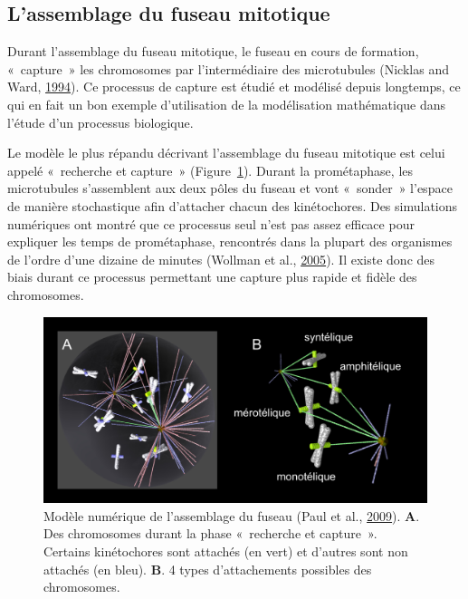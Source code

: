 \documentclass[12pt,a4paper,twoside,openright]{book}
\begin{document}
\subsection{L'assemblage du fuseau
mitotique}\label{lassemblage-du-fuseau-mitotique}

Durant l'assemblage du fuseau mitotique, le fuseau en cours de
formation, «~capture~» les chromosomes par l'intermédiaire des
microtubules (Nicklas and Ward,
\protect\hyperlink{ref-Nicklas1994}{1994}). Ce processus de capture est
étudié et modélisé depuis longtemps, ce qui en fait un bon exemple
d'utilisation de la modélisation mathématique dans l'étude d'un
processus biologique.

Le modèle le plus répandu décrivant l'assemblage du fuseau mitotique est
celui appelé «~recherche et capture~» (Figure~\ref{fig:mogilner}).
Durant la prométaphase, les microtubules s'assemblent aux deux pôles du
fuseau et vont «~sonder~» l'espace de manière stochastique afin
d'attacher chacun des kinétochores. Des simulations numériques ont
montré que ce processus seul n'est pas assez efficace pour expliquer les
temps de prométaphase, rencontrés dans la plupart des organismes de
l'ordre d'une dizaine de minutes (Wollman et al.,
\protect\hyperlink{ref-Wollman2005}{2005}). Il existe donc des biais
durant ce processus permettant une capture plus rapide et fidèle des
chromosomes.

\begin{figure}[htbp]
\centering
\includegraphics{figures/intro/mogilner.png}
\caption[Modèle numérique de l'assemblage du fuseau]{\label{fig:mogilner}Modèle
numérique de l'assemblage du fuseau (Paul et al.,
\protect\hyperlink{ref-Paul2009}{2009}). \textbf{A}. Des chromosomes
durant la phase «~recherche et capture~». Certains kinétochores sont
attachés (en vert) et d'autres sont non attachés (en bleu). \textbf{B}.
4 types d'attachements possibles des chromosomes.}
\end{figure}
\end{document}
